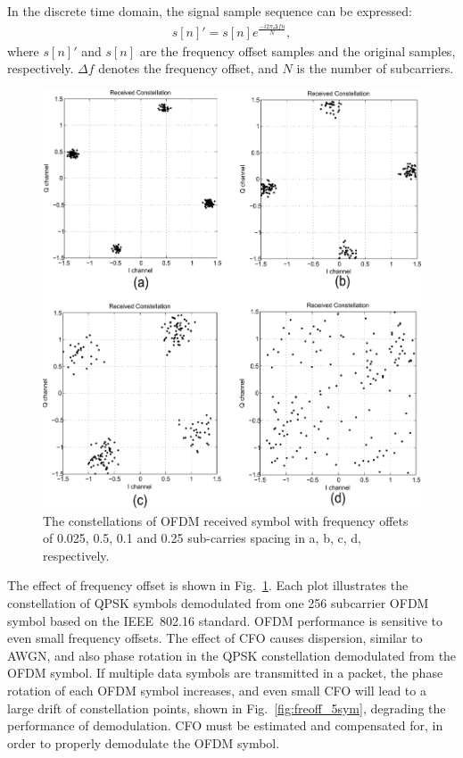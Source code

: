 In the discrete time domain, the signal sample sequence can be expressed:
\begin{eqnarray}
\label{equ:}
            s[n]' = s[n] e^{\frac{− i2\pi \Delta fn}{N}},
\end{eqnarray}
where $s[n]'$ and $s[n]$ are the frequency offset samples and the original samples, respectively.
$\Delta f$ denotes the frequency offset, and $N$ is the number of subcarriers.
\begin{figure}
	\centerline{\includegraphics [width=0.8\columnwidth] {Figures/freoff_1sym.pdf} }
	\caption{The constellations of OFDM received symbol with frequency offets of 0.025, 0.5, 0.1 and 0.25 sub-carries spacing in a, b, c, d, respectively.}
	\label{fig:freoff_1sym}
\end{figure}
The effect of frequency offset is shown in Fig.~\ref{fig:freoff_1sym}. Each plot illustrates the constellation of QPSK symbols demodulated from one 256 subcarrier OFDM symbol based on the IEEE~802.16 standard.
OFDM performance is sensitive to even small frequency offsets.
The effect of CFO causes dispersion, similar to AWGN, and also phase rotation in the QPSK constellation demodulated from the OFDM symbol.
If multiple data symbols are transmitted in a packet, the phase rotation of each OFDM symbol increases, and even small CFO will lead to a large drift of constellation points, shown in Fig.~\ref{fig:freoff_5sym}, degrading the performance of demodulation. CFO must be estimated and compensated for, in order to properly demodulate the OFDM symbol.

